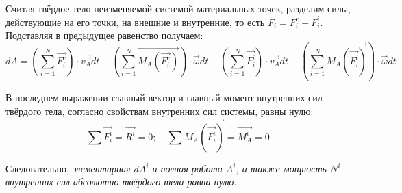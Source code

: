 Считая твёрдое тело неизменяемой системой материальных точек, разделим силы, 
действующие на его точки, на внешние и внутренние, то есть 
\( F_i = F^e_i + F^i_i \). Подставляя в предыдущее равенство получаем:
\[ 
	dA = \left( \sum_{i=1}^{N} \vec{F^e_i} \right)\cdot\vec{v_A}dt + 
	\left( \sum_{i=1}^{N} \vec{M_A(\vec{F^e_i})} \right)\cdot\vec{\omega}dt +
	\left( \sum_{i=1}^{N} \vec{F^i_i} \right)\cdot\vec{v_A}dt + 
	\left( \sum_{i=1}^{N} \vec{M_A(\vec{F^i_i})} \right)\cdot\vec{\omega}dt
\]

В последнем выражении главный вектор и главный момент внутренних сил 
твёрдого тела, согласно свойствам внутренних сил системы, равны нулю:
\[ 
	\sum\vec{F^i_i} = \vec{R^i} = 0;\quad 
	\sum\vec{M_A(\vec{F^i_i})} = \vec{M^i_A} = 0
\]

Следовательно, \emph{элементарная \( dA^i\) и полная работа \( A^i \), 
а также мощность \( N^i \) внутренних сил абсолютно твёрдого тела 
равна нулю.}

\newpage
